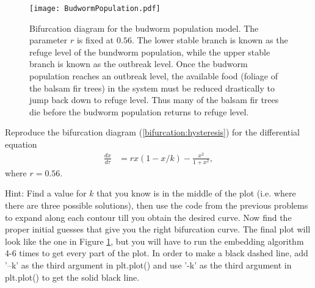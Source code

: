 \newpage
\begin{figure}
\centering
\texttt{[image: BudwormPopulation.pdf]}
\caption{Bifurcation diagram for the budworm population model.
The parameter $r$ is fixed at $0.56.$
The lower stable branch is known as the refuge level of the bundworm population, while the upper stable branch is known as the outbreak level.
Once the budworm population reaches an outbreak level, the available food (foliage of the balsam fir trees) in the system must be reduced drastically to jump back down to refuge level.
Thus many of the balsam fir trees die before the budworm population returns to refuge level.}
\label{bifurcation:budworm}
\end{figure}

\newpage
\begin{problem}
Reproduce the bifurcation diagram (\ref{bifurcation:hysteresis}) for the differential equation
\begin{align*}
	\frac{dx}{d \tau} &= rx(1-x/k) - \frac{x^2}{1+x^2},
\end{align*}
where $r = 0.56$.

Hint: Find a value for $k$ that you know is in the middle of the plot (i.e. where there are three possible solutions), then use the code from the previous problems to expand along each contour till you obtain the desired curve.
Now find the proper initial guesses that give you the right bifurcation curve.
The final plot will look like the one in Figure \ref{bifurcation:budworm}, but you will have to run the embedding algorithm 4-6 times to get every part of the plot. In order to make a black dashed line, add '--k' as the third argument in plt.plot() and use '-k' as the third argument in plt.plot() to get the solid black line.
\end{problem} 